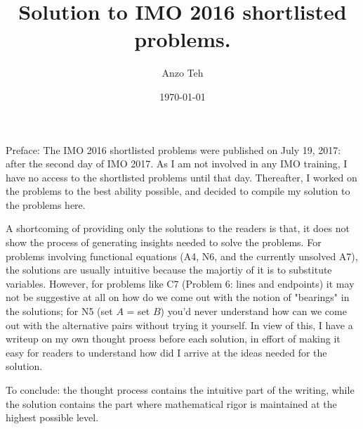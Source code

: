 \documentclass[11pt,a4paper]{article}
\begin{document}
\newcommand{\la}{\leftarrow}
\newcommand{\lra}{\leftrightarrow}


\title{Solution to IMO 2016 shortlisted problems.}
\author{Anzo Teh}
\date{\today}
\maketitle

Preface: 
The IMO 2016 shortlisted problems were published on July 19, 2017: after the second day of IMO 2017. As I am not involved in any IMO training, I have no access to the shortlisted problems until that day. Thereafter, I worked on the problems to the best ability possible, and decided to compile my solution to the problems here. 

A shortcoming of providing only the solutions to the readers is that, it does not show the process of generating insights needed to solve the problems. 
For problems involving functional equations (A4, N6, and the currently unsolved A7), the solutions are usually intuitive because the majortiy of it is to substitute variables. 
However, for problems like C7 (Problem 6: lines and endpoints) it may not be suggestive at all on how do we come out with the notion of "bearings" in the solutions; for N5 (set $A$ = set $B$) you'd never understand how can we come out with the alternative pairs without trying it yourself. 
In view of this, I have a writeup on my own thought proess before each solution, in effort of making it easy for readers to understand how did I arrive at the ideas needed for the solution. 

To conclude: the thought process contains the intuitive part of the writing, while the solution contains the part where mathematical rigor is maintained at the highest possible level. 

\newpage
\end{document}
